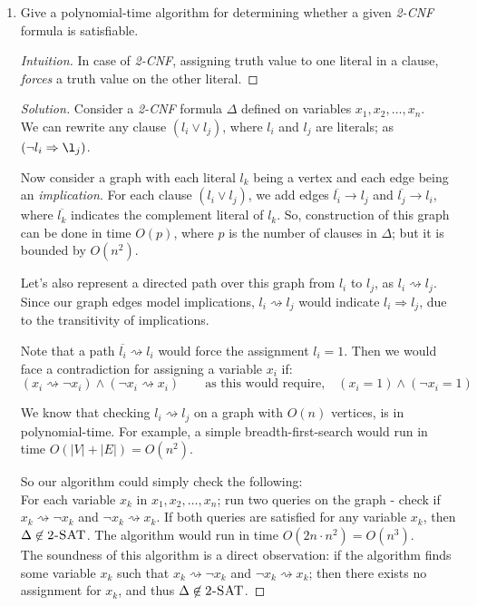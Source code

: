 \documentclass[usletter]{article}
\newcommand {\namedlangset}[1] {\ensuremath{\textnormal{\textsc{#1}}}}
\newcommand {\term}[1]      {\textit{#1}}
\begin{document}
\begin{enumerate}[labelsep=2.5em, label=\textbf{\arabic{enumi}}]
\item Give a polynomial-time algorithm for determining whether a given
      \term{2-CNF} formula is satisfiable.
  \begin{proof}[Intuition]
    In case of \term{2-CNF}, assigning truth value to one literal in a
    clause, \textit{forces} a truth value on the other literal.
  \end{proof}
  \begin{proof}[Solution]
    Consider a \term{2-CNF} formula $\Delta$ defined on variables
    $x_1, x_2, \ldots, x_n$. \\
    We can rewrite any clause $(l_i \vee l_j)$, where $l_i$ and $l_j$ are
    literals; as $(\neg l_i \Rightarrow \l_j)$.

    Now consider a graph with each literal $l_k$ being a vertex and each edge
    being an \textit{implication}. For each clause $(l_i \vee l_j)$, we add
    edges $\overline{l_i} \longrightarrow l_j$ and
    $\overline{l_j} \longrightarrow l_i$, where $\overline{l_k}$ indicates the
    complement literal of $l_k$. So, construction of this graph can be done in
    time $O(p)$, where $p$ is the number of clauses in $\Delta$; but it is
    bounded by $O(n^2)$.

    Let's also represent a directed path over this graph from $l_i$ to $l_j$, as
    $l_i \rightsquigarrow l_j$. Since our graph edges model implications,
    $l_i \rightsquigarrow l_j$ would indicate $l_i \Rightarrow l_j$, due to the
    transitivity of implications.

    Note that a path $\overline{l_i} \rightsquigarrow l_i$ would force the
    assignment $l_i = 1$. Then we would face a contradiction for assigning a
    variable $x_i$ if:
    $$
      (x_i \rightsquigarrow \neg x_i) \wedge (\neg x_i \rightsquigarrow x_i)
      \qquad \text{as this would require,}
      \quad (x_i = 1) \wedge (\neg x_i = 1)
    $$

    We know that checking $l_i \rightsquigarrow l_j$ on a graph with $O(n)$
    vertices, is in polynomial-time. For example, a simple breadth-first-search
    would run in time $O(|V|+|E|) = O(n^2)$.

    So our algorithm could simply check the following: \\
    For each variable $x_k$ in $x_1, x_2, \ldots, x_n$; run two queries on the
    graph - check if $x_k \rightsquigarrow \neg x_k$ and
    $\neg x_k \rightsquigarrow x_k$. If both queries are satisfied for any
    variable $x_k$, then $\Delta \not\in \namedlangset{2-SAT}$. The algorithm
    would run in time $O(2 n \cdot n^2) = O(n^3)$. \\
    The soundness of this algorithm is a direct observation: if the algorithm
    finds some variable $x_k$ such that $x_k \rightsquigarrow \neg x_k$ and
    $\neg x_k \rightsquigarrow x_k$; then there exists no assignment for $x_k$,
    and thus $\Delta \not\in \namedlangset{2-SAT}$.


\end{proof}
\end{enumerate}
\end{document}
